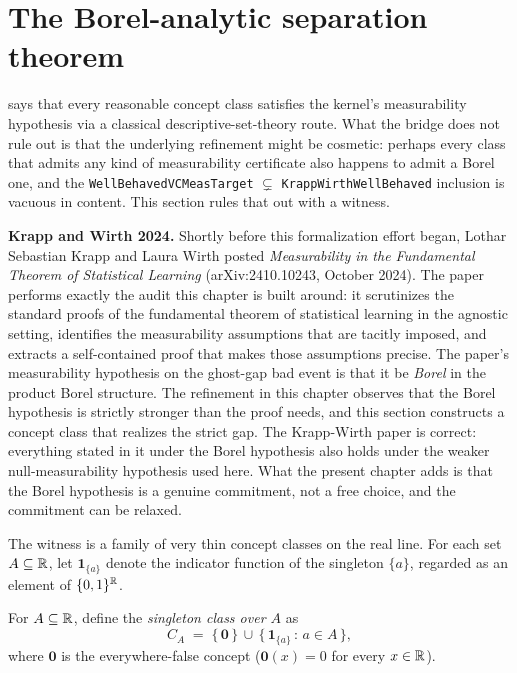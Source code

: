 \section{The Borel-analytic separation theorem}
\label{sec:borel-analytic-sep}

 says that every reasonable
concept class satisfies the kernel's measurability hypothesis via a
classical descriptive-set-theory route.  What the bridge does not
rule out is that the underlying refinement might be cosmetic: perhaps
every class that admits any kind of measurability certificate also
happens to admit a Borel one, and the \texttt{WellBehavedVCMeasTarget}
$\subsetneq$ \texttt{KrappWirthWellBehaved} inclusion is vacuous in
content.  This section rules that out with a witness.

\begin{historical}
\textbf{Krapp and Wirth 2024.}  Shortly before this formalization
effort began, Lothar Sebastian Krapp and Laura Wirth posted
\emph{Measurability in the Fundamental Theorem of Statistical
Learning} (arXiv:2410.10243, October 2024).  The paper performs
exactly the audit this chapter is built around: it scrutinizes the
standard proofs of the fundamental theorem of statistical learning in
the agnostic setting, identifies the measurability assumptions that
are tacitly imposed, and extracts a self-contained proof that makes
those assumptions precise.  The paper's measurability hypothesis on
the ghost-gap bad event is that it be \emph{Borel} in the product
Borel structure.  The refinement in this chapter observes that the
Borel hypothesis is strictly stronger than the proof needs, and this
section constructs a concept class that realizes the strict gap.  The
Krapp-Wirth paper is correct: everything stated in it under the
Borel hypothesis also holds under the weaker null-measurability
hypothesis used here.  What the present chapter adds is that the
Borel hypothesis is a genuine commitment, not a free choice, and the
commitment can be relaxed.
\end{historical}

The witness is a family of very thin concept classes on the real line.
For each set $A \subseteq \mathbb{R}$, let $\mathbf{1}_{\{a\}}$ denote the
indicator function of the singleton $\{a\}$, regarded as an element of
$\{0,1\}^{\mathbb{R}}$.

\begin{defn}
\label{def:singleton-class}
  \leanok
For $A \subseteq \mathbb{R}$, define the \emph{singleton class over $A$} as
\[
  C_A \;=\; \{\,\mathbf{0}\,\}\,\cup\,
            \bigl\{\,\mathbf{1}_{\{a\}}\,:\,a \in A\,\bigr\},
\]
where $\mathbf{0}$ is the everywhere-false concept
($\mathbf{0}(x) = 0$ for every $x \in \mathbb{R}$).
\end{defn}


